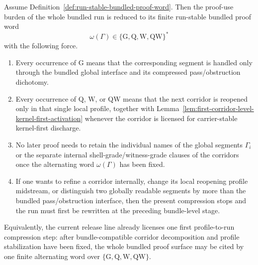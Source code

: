 \begin{proposition}
\label{prop:first-profile-to-run-compression-principle}
Assume Definition~\ref{def:run-stable-bundled-proof-word}. Then the proof-use burden of the whole bundled run is reduced to its finite run-stable bundled proof word
\[
\omega(\Gamma)\in\{\mathrm{G},\mathrm{Q},\mathrm{W},\mathrm{QW}\}^{*}
\]
with the following force.
\begin{enumerate}[leftmargin=2em,label=(\roman*)]
\item Every occurrence of $\mathrm{G}$ means that the corresponding segment is handled only through the bundled global interface and its compressed pass/obstruction dichotomy.
\item Every occurrence of $\mathrm{Q}$, $\mathrm{W}$, or $\mathrm{QW}$ means that the next corridor is reopened only in that single local profile, together with Lemma~\ref{lem:first-corridor-level-kernel-first-activation} whenever the corridor is licensed for carrier-stable kernel-first discharge.
\item No later proof needs to retain the individual names of the global segments $\Gamma_i$ or the separate internal shell-grade/witness-grade clauses of the corridors once the alternating word $\omega(\Gamma)$ has been fixed.
\item If one wants to refine a corridor internally, change its local reopening profile midstream, or distinguish two globally readable segments by more than the bundled pass/obstruction interface, then the present compression stops and the run must first be rewritten at the preceding bundle-level stage.
\end{enumerate}
Equivalently, the current release line already licenses one first profile-to-run compression step: after bundle-compatible corridor decomposition and profile stabilization have been fixed, the whole bundled proof surface may be cited by one finite alternating word over $\{\mathrm{G},\mathrm{Q},\mathrm{W},\mathrm{QW}\}$.
\end{proposition}

